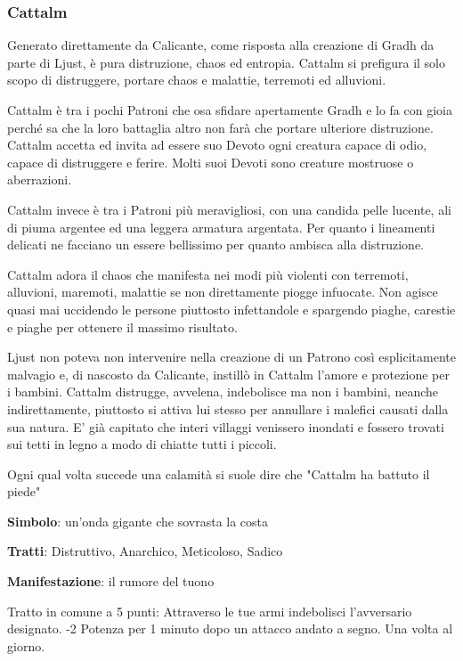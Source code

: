 \documentclass[a4paper,11pt,twoside,openany]{book}
\begin{document}
\subsubsection{Cattalm}

\label{cattalm}

Generato direttamente da Calicante, come risposta alla creazione di Gradh da parte di Ljust, è pura distruzione, chaos ed entropia. Cattalm si prefigura il solo scopo di distruggere, portare chaos e malattie, terremoti ed alluvioni.

Cattalm è tra i pochi Patroni che osa sfidare apertamente Gradh e lo fa con gioia perché sa che la loro battaglia altro non farà che portare ulteriore distruzione. Cattalm accetta ed invita ad essere suo Devoto ogni creatura capace di odio, capace di distruggere e ferire. Molti suoi Devoti sono creature mostruose o aberrazioni.

Cattalm invece è tra i Patroni più meravigliosi, con una candida pelle lucente, ali di piuma argentee ed una leggera armatura argentata. Per quanto i lineamenti delicati ne facciano un essere bellissimo per quanto ambisca alla distruzione.

Cattalm adora il chaos che manifesta nei modi più violenti con terremoti, alluvioni, maremoti, malattie se non direttamente piogge infuocate. Non agisce quasi mai uccidendo le persone piuttosto infettandole e spargendo piaghe, carestie e piaghe per ottenere il massimo risultato.

Ljust non poteva non intervenire nella creazione di un Patrono così esplicitamente malvagio e, di nascosto da Calicante, instillò in Cattalm l'amore e protezione per i bambini. Cattalm distrugge, avvelena, indebolisce ma non i bambini, neanche indirettamente, piuttosto si attiva lui stesso per annullare i malefici causati dalla sua natura.
E' già capitato che interi villaggi venissero inondati e fossero trovati sui tetti in legno a modo di chiatte tutti i piccoli.

Ogni qual volta succede una calamità si suole dire che "Cattalm ha battuto il piede"

\textbf{Simbolo}: un'onda gigante che sovrasta la costa

\textbf{Tratti}: Distruttivo, Anarchico, Meticoloso, Sadico

\textbf{Manifestazione}: il rumore del tuono

\bigskip

Tratto in comune a 5 punti: Attraverso le tue armi indebolisci l'avversario designato. -2 Potenza per 1 minuto dopo un attacco andato a segno. Una volta al giorno.
\end{document}
